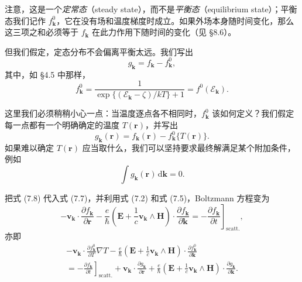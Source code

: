 注意，这是一个\emph{定常态}（steady state），而不是\emph{平衡态}（equilibrium state）；平衡态我们记作 $f_{\mathbf{k}}^{0}$，它在没有场和温度梯度时成立。如果外场本身随时间变化，那么这三项之和必须等于 $f_{\mathbf{k}}$ 在此力作用下随时间的变化（见 §8.6）。

但我们假定，定态分布不会偏离平衡太远。我们写出
\begin{equation*}
g_{\mathbf{k}}=f_{\mathbf{k}}-f_{\mathbf{k}}^{0},\tag{7.8}
\end{equation*}
其中，如 §4.5 中那样，
\begin{equation*}
f_{\mathbf{k}}^{0}=\frac{1}{\exp\{(\mathcal{E}_{\mathbf{k}}-\zeta)/kT\}+1}=f^{0}(\mathcal{E}_{\mathbf{k}}).\tag{7.9}
\end{equation*}

这里我们必须稍稍小心一点：当温度逐点各不相同时，$f_{\mathbf{k}}^{0}$ 该如何定义？我们假定每一点都有一个明确确定的温度 $T(\mathbf{r})$，并写出
\begin{equation*}
g_{\mathbf{k}}(\mathbf{r})=f_{\mathbf{k}}(\mathbf{r})-f_{\mathbf{k}}^{0}\{T(\mathbf{r})\}.\tag{7.10}
\end{equation*}
如果难以确定 $T(\mathbf{r})$ 应当取什么，我们可以坚持要求最终解满足某个附加条件，例如
\begin{equation*}
\int g_{\mathbf{k}}(\mathbf{r})\,\mathrm{d}\mathbf{k}=0.\tag{7.11}
\end{equation*}

把式 (7.8) 代入式 (7.7)，并利用式 (7.2) 和式 (7.5)，Boltzmann 方程变为
\begin{equation*}
-\mathbf{v}_{\mathbf{k}}\cdot\frac{\partial f_{\mathbf{k}}}{\partial\mathbf{r}}
-\frac{e}{\hbar}\left(\mathbf{E}+\frac{1}{c}\mathbf{v}_{\mathbf{k}}\wedge\mathbf{H}\right)\cdot\frac{\partial f_{\mathbf{k}}}{\partial\mathbf{k}}
=-\left.\frac{\partial f_{\mathbf{k}}}{\partial t}\right]_{\text{scatt.}},\tag{7.12}
\end{equation*}
亦即
\begin{align*}
-\mathbf{v}_{\mathbf{k}}\cdot\frac{\partial f_{\mathbf{k}}^{0}}{\partial T}\nabla T
-\frac{e}{\hbar}\left(\mathbf{E}+\frac{1}{c}\mathbf{v}_{\mathbf{k}}\wedge\mathbf{H}\right)\cdot\frac{\partial f_{\mathbf{k}}^{0}}{\partial\mathbf{k}}\\
=-\left.\frac{\partial f_{\mathbf{k}}}{\partial t}\right]_{\text{scatt.}}
+\mathbf{v}_{\mathbf{k}}\cdot\frac{\partial g_{\mathbf{k}}}{\partial\mathbf{r}}
+\frac{e}{\hbar}\left(\mathbf{E}+\frac{1}{c}\mathbf{v}_{\mathbf{k}}\wedge\mathbf{H}\right)\cdot\frac{\partial g_{\mathbf{k}}}{\partial\mathbf{k}}.\tag{7.13}
\end{align*}

